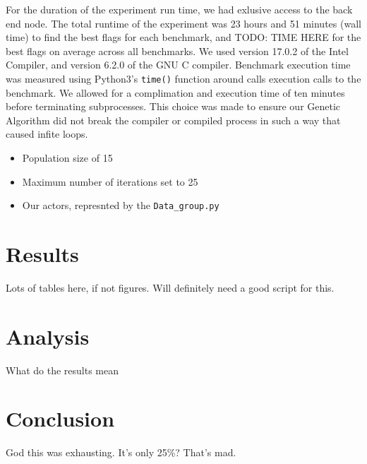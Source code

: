 \documentclass[conference]{IEEEtran}
\begin{document}
For the duration of the experiment run time, we had exlusive access to the back end node. The total runtime of the experiment was 23 hours and 51 minutes (wall time) to find the best flags for each benchmark, and TODO: TIME HERE for the best flags on average across all benchmarks. We used version 17.0.2 of the Intel Compiler, and version 6.2.0 of the GNU C compiler.  Benchmark execution time was measured using Python3's \texttt{time()} function around calls execution calls to the benchmark. We allowed for a complimation and execution time of ten minutes before terminating subprocesses. This choice was made to ensure our Genetic Algorithm did not break the compiler or compiled process in such a way that caused infite loops.
\begin{itemize}
  \item Population size of 15
  \item Maximum number of iterations set to 25
  \item Our actors, represnted by the \texttt{Data\_group.py}
\end{itemize}

\section{Results}
Lots of tables here, if not figures. Will definitely need a good script for this.

\section{Analysis}
What do the results mean

\section{Conclusion}
God this was exhausting. It's only 25\%? That's mad.



\end{document}
